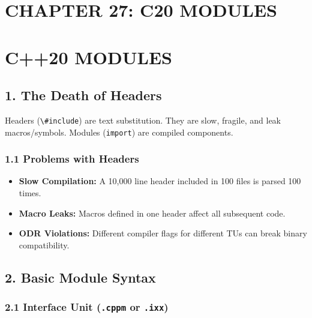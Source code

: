 \hypertarget{chapter-27-c20-modules}{%
\section{CHAPTER 27: C20 MODULES}\label{chapter-27-c20-modules}}

\hypertarget{c20-modules}{%
\section{C++20 MODULES}\label{c20-modules}}

\hypertarget{the-death-of-headers}{%
\subsection{1. The Death of Headers}\label{the-death-of-headers}}

Headers (\passthrough{\lstinline!\#include!}) are text substitution.
They are slow, fragile, and leak macros/symbols. Modules
(\passthrough{\lstinline!import!}) are compiled components.

\hypertarget{problems-with-headers}{%
\subsubsection{1.1 Problems with Headers}\label{problems-with-headers}}

\begin{itemize}
\tightlist
\item
  \textbf{Slow Compilation:} A 10,000 line header included in 100 files
  is parsed 100 times.
\item
  \textbf{Macro Leaks:} Macros defined in one header affect all
  subsequent code.
\item
  \textbf{ODR Violations:} Different compiler flags for different TUs
  can break binary compatibility.
\end{itemize}

\hypertarget{basic-module-syntax}{%
\subsection{2. Basic Module Syntax}\label{basic-module-syntax}}

\hypertarget{interface-unit-.cppm-or-.ixx}{%
\subsubsection{\texorpdfstring{2.1 Interface Unit (\texttt{.cppm} or
\texttt{.ixx})}{2.1 Interface Unit (.cppm or .ixx)}}\label{interface-unit-.cppm-or-.ixx}}

